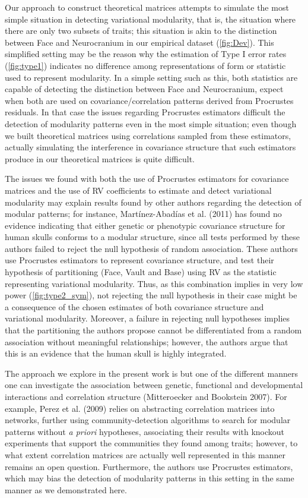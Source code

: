 \documentclass[12pt,]{article}
\begin{document}
Our approach to construct theoretical matrices attempts to simulate the
most simple situation in detecting variational modularity, that is, the
situation where there are only two subsets of traits; this situation is
akin to the distinction between Face and Neurocranium in our empirical
dataset (\autoref{fig:Dev}). This simplified setting may be the reason
why the estimation of Type I error rates (\autoref{fig:type1}) indicates
no difference among representations of form or statistic used to
represent modularity. In a simple setting such as this, both statistics
are capable of detecting the distinction between Face and Neurocranium,
expect when both are used on covariance/correlation patterns derived
from Procrustes residuals. In that case the issues regarding Procrustes
estimators difficult the detection of modularity patterns even in the
most simple situation; even though we built theoretical matrices using
correlations sampled from these estimators, actually simulating the
interference in covariance structure that such estimators produce in our
theoretical matrices is quite difficult.

The issues we found with both the use of Procrustes estimators for
covariance matrices and the use of RV coefficients to estimate and
detect variational modularity may explain results found by other authors
regarding the detection of modular patterns; for instance,
Martínez-Abadías et al. (2011) has found no evidence indicating that
either genetic or phenotypic covariance structure for human skulls
conforms to a modular structure, since all tests performed by these
authors failed to reject the null hypothesis of random association.
These authors use Procrustes estimators to represent covariance
structure, and test their hypothesis of partitioning (Face, Vault and
Base) using RV as the statistic representing variational modularity.
Thus, as this combination implies in very low power
(\autoref{fig:type2_sym}), not rejecting the null hypothesis in their
case might be a consequence of the chosen estimates of both covariance
structure and variational modularity. Moreover, a failure in rejecting
null hypotheses implies that the partitioning the authors propose cannot
be differentiated from a random association without meaningful
relationships; however, the authors argue that this is an evidence that
the human skull is highly integrated.

The approach we explore in the present work is but one of the different
manners one can investigate the association between genetic, functional
and developmental interactions and correlation structure (Mitteroecker
and Bookstein 2007). For example, Perez et al. (2009) relies on
abstracting correlation matrices into networks, further using
community-detection algorithms to search for modular patterns without
\emph{a priori} hypotheses, associating their results with knockout
experiments that support the communities they found among traits;
however, to what extent correlation matrices are actually well
represented in this manner remains an open question. Furthermore, the
authors use Procrustes estimators, which may bias the detection of
modularity patterns in this setting in the same manner as we
demonstrated here.
\end{document}
